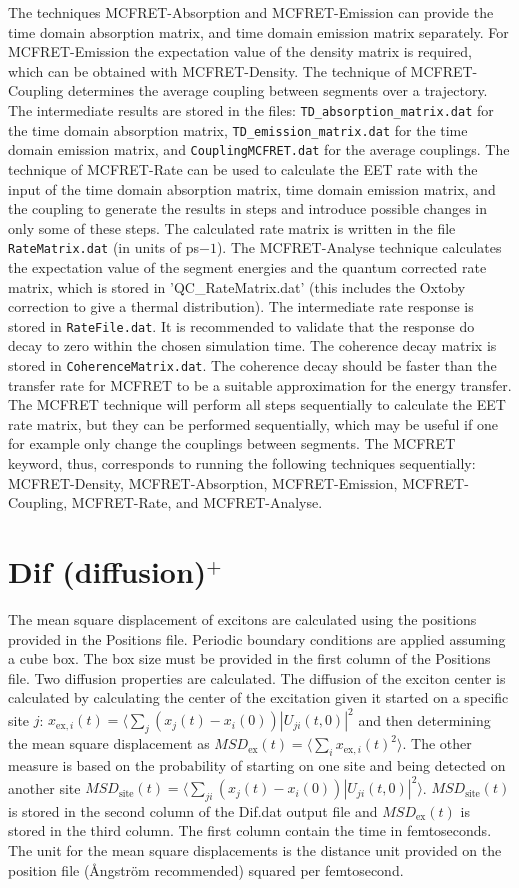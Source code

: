 The techniques MCFRET-Absorption and MCFRET-Emission can provide the time domain absorption matrix, and time domain emission matrix separately.
For MCFRET-Emission the expectation value of the density matrix is required, which can be obtained with MCFRET-Density.
The technique of MCFRET-Coupling determines the average coupling between segments over a trajectory. The intermediate results are stored in the files:
 {\tt TD\_absorption\_matrix.dat} for the time domain absorption matrix, {\tt TD\_emission\_matrix.dat} for the time domain emission matrix, and  {\tt CouplingMCFRET.dat} for the average couplings. 
The technique of MCFRET-Rate can be used to calculate the EET rate with the input of the time domain absorption matrix, time domain emission matrix, and the coupling to generate the results in steps and introduce possible changes in only some of these steps.  The calculated rate matrix is written in the file {\tt RateMatrix.dat} (in units of ps${-1}$). The MCFRET-Analyse technique calculates the expectation value of the segment energies and the quantum corrected rate matrix, which is stored in 'QC\_RateMatrix.dat' (this includes the Oxtoby correction to give a thermal distribution). The intermediate  rate response is stored in {\tt RateFile.dat}. It is recommended to validate that the response do decay to zero within the chosen simulation time. The coherence decay matrix is stored in {\tt CoherenceMatrix.dat}. The coherence decay should be faster than the transfer rate for MCFRET to be a suitable approximation for the energy transfer.
The MCFRET technique will perform all steps sequentially to calculate the EET rate matrix, but they can be performed sequentially, which may be useful if one for example only change the couplings between segments. 
The MCFRET keyword, thus, corresponds to running the following techniques sequentially: MCFRET-Density, MCFRET-Absorption, MCFRET-Emission, MCFRET-Coupling, MCFRET-Rate, and MCFRET-Analyse.

\section{Dif (diffusion)$^{+}$}
The mean square displacement of excitons are calculated using the positions provided in the Positions file. Periodic boundary conditions are applied assuming a cube box. The box size must be provided in the first column of the Positions file.
Two diffusion properties are calculated. The diffusion of the exciton center is calculated by calculating the center of the excitation given it started on a specific site $j$: $x_{\textrm{ex},i}(t)=\langle \sum_j (x_j(t)-x_i(0)) |U_{ji}(t,0)|^2$ and then determining the mean square displacement as $MSD_{\textrm{ex}}(t)=\langle \sum_i  x_{\textrm{ex},i}(t)^2\rangle$. The other measure is based on the probability of starting on one site and being detected on another site $MSD_{\textrm{site}}(t)=\langle \sum_{ji} (x_j(t)-x_i(0))|U_{ji}(t,0)|^2\rangle$. $MSD_{\textrm{site}}(t)$ is stored in the second column of the Dif.dat output file and $MSD_{\textrm{ex}}(t)$ is stored in the third column. The first column contain the time in femtoseconds. The unit for the mean square displacements is the distance unit provided on the position file (\AA ngstr\"{o}m recommended) squared per femtosecond. 
